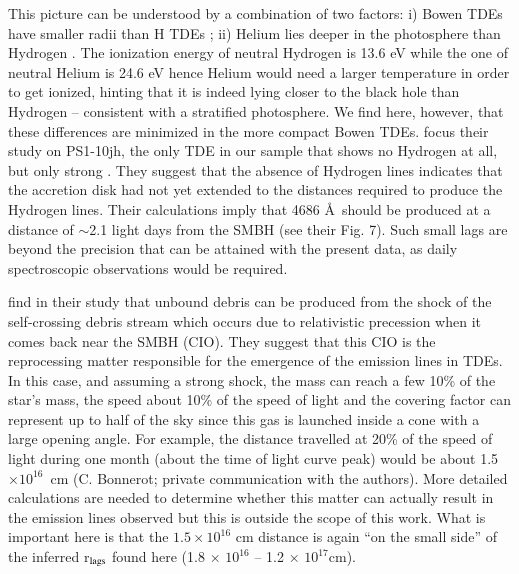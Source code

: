 \documentclass[structabstract]{aa}
\begin{document}
This picture can be understood by a combination of two factors: 
i)  Bowen TDEs have smaller radii than H TDEs \citep{vanvelzen2021};
ii) Helium lies deeper in the photosphere than Hydrogen \citep{Roth2016}. The ionization energy of neutral Hydrogen is 13.6 eV while the one of neutral Helium is 24.6 eV hence Helium would need a larger temperature in order to get ionized, hinting that it is indeed lying closer to the black hole than Hydrogen -- consistent with a stratified photosphere. 
We find here, however, that these differences are minimized in the more compact Bowen TDEs. \citet{Guillochon2014} focus their study on PS1-10jh, the only TDE in our sample that shows no Hydrogen at all, but only strong . They suggest that the absence of Hydrogen lines indicates that the accretion disk had not yet extended to the distances required to produce the Hydrogen lines. Their calculations imply that  4686 \AA\, should be produced at a distance of $\sim$2.1 light days from the SMBH (see their Fig. 7). Such small lags are beyond the precision that can be attained with the present data, as daily spectroscopic observations would be required. 



\citet{Lu2020} find in their study that unbound debris can be produced from the shock of the self-crossing debris stream which occurs due to relativistic precession when it comes back near the SMBH (CIO). They suggest that this CIO is the reprocessing matter responsible for the emergence of the emission lines in TDEs. In this case, and assuming a strong shock, the mass can reach a few 10\% of the star's mass, the speed about 10\% of the speed of light and the covering factor can represent up to half of the sky since this gas is launched inside a cone with a large opening angle. For example, the distance travelled at 20\% of the speed of light during one month (about the time of light curve peak) would be about 1.5 $\times 10^{16}$~cm (C. Bonnerot; private communication with the authors). More detailed calculations are needed to determine whether this matter can actually result in the emission lines observed but this is outside the scope of this work. What is important here is that the $1.5 \times 10^{16}$ cm distance is again ``on the small side'' of the inferred r$_{\rm lags}$ found here (1.8$\,\times\,10^{16}$ -- 1.2$\,\times\,10^{17}$cm).
\end{document}
